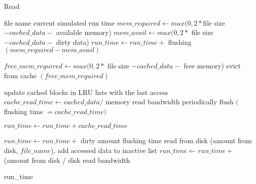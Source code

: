 \documentclass[conference]{IEEEtran}
\newcommand{\Desc}[2]{\State \makebox[5em][l]{#1}#2}
\begin{document}
			\begin{algorithm}\caption{Read}\label{alg:read}
				\small
				\begin{algorithmic}[1]
					\Input
        				\Desc{$file\_name$}{file name}
			        	\Desc{$run\_time$}{current simulated run time}
   					\EndInput
					\State $mem\_required \gets max(0, 2* $file size$-cached\_data -$ available memory)
					\State $mem\_avail \gets max(0, 2 *$ file size$ - cached\_data -$ dirty data)
    					\State $run\_time \gets run\_time + $  flushing $(mem\_required - mem\_avail)	$
					\EndIf
										
					\State $free\_mem\_required \gets max(0, 2 *$ file size $- cached\_data -$ free memory)
						\State evict from cache $(free\_mem\_required)$
					\EndIf
						
    					\State update cached blocks in LRU lists with the last access
    						\State $cache\_read\_time \gets cached\_data /$ memory read bandwidth
    						\State periodically flush $($flushing time $= cache\_read\_time)$
    						
							\Return $run\_time \gets run\_time + cache\_read\_time$
						\EndIf
					\EndIf

							\State $run\_time \gets run\_time +$ dirty amount flushing time
						\EndIf
						\State read from disk (amount from disk, $file\_name$), add accessed data to inactive list
    					\State $run\_time \gets run\_time +$ (amount from disk / disk read bandwidth
					\EndIf
					
					\Return run{\_}time
					
				\end{algorithmic}
			\end{algorithm}			
			
\end{document}
